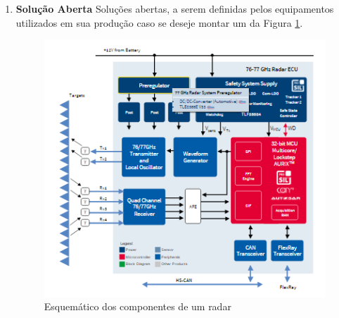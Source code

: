\begin{enumerate}
\begin{enumerate}
\begin{enumerate}
  \end{enumerate}
\end{enumerate}


\item \textbf{Solução Aberta}
Soluções abertas, a serem definidas pelos equipamentos utilizados em sua produção caso se deseje montar um da
Figura \ref{fig:esquematico_radar}.
\begin{figure}[h]
  \centering
  \includegraphics[width=400px, scale=1]{figuras/esquematico_radar}
  \caption{Esquemático dos componentes de um radar}
\label{fig:esquematico_radar}
\end{figure}
\end{enumerate}
